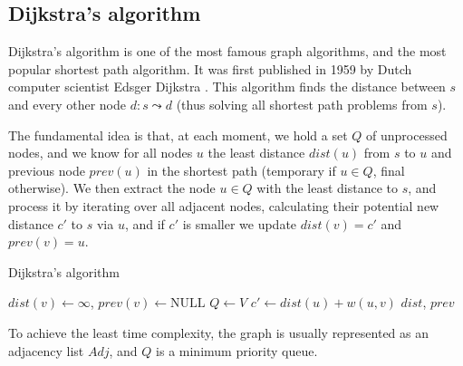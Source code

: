 \subsection{Dijkstra's algorithm} \label{algorithm-shortestpath-dijkstra}
Dijkstra's algorithm is one of the most famous graph algorithms, and the most popular shortest path algorithm. It was first published in 1959 by Dutch computer scientist Edsger Dijkstra \cite{dijkstra}. This algorithm finds the distance between $s$ and every other node $d \colon s \leadsto d$ (thus solving all shortest path problems from $s$).\par
The fundamental idea is that, at each moment, we hold a set $Q$ of unprocessed nodes, and we know for all nodes $u$ the least distance $dist(u)$ from $s$ to $u$ and previous node $prev(u)$ in the shortest path (temporary if $u \in Q$, final otherwise). We then extract the node $u \in Q$ with the least distance to $s$, and process it by iterating over all adjacent nodes, calculating their potential new distance $c'$ to $s$ via $u$, and if $c'$ is smaller we update $dist(v)=c'$ and $prev(v)=u$.\par
\begin{algorithm}[h]
    \caption{Dijkstra's algorithm}
    \label{alg-dijkstra}
    \begin{algorithmic}[1]
                {$dist(v) \gets \infty$, $prev(v) \gets \text{NULL}$} 
            \EndFor
            \State $Q \gets V$
             
                    \State $c' \gets dist(u) + w(u, v)$
                    \EndIf
                \EndFor
            \EndWhile
            \State \Return $dist$, $prev$
        \EndFunction
    \end{algorithmic}
\end{algorithm}
To achieve the least time complexity, the graph is usually represented as an adjacency list $Adj$, and $Q$ is a minimum priority queue.
